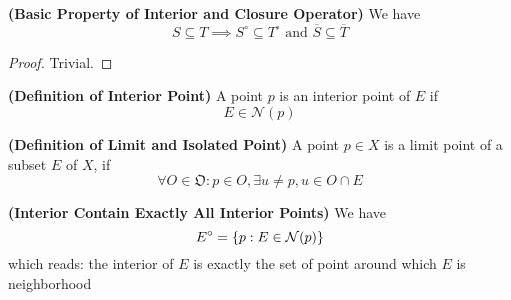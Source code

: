 \documentclass{report}
\begin{document}
\begin{theorem}
\label{2.6.5}
\textbf{(Basic Property of Interior and Closure Operator)} We have
\begin{equation}
S\subseteq T \implies S^\circ \subseteq T^\circ\text{ and }\overline{S}\subseteq \overline{T}
\end{equation}
\end{theorem}
\begin{proof}
Trivial.
\end{proof}
\begin{definition}
\label{2.6.6}
\textbf{(Definition of Interior Point)} A point $p$ is an interior point of $E$ if
\begin{equation}
E\in \mathcal{N}(p)
\end{equation}
\end{definition}
\begin{definition}
\label{2.6.7}
\textbf{(Definition of Limit and Isolated Point)} A point $p \in X$ is a limit point of a subset $E$ of $X$, if 
\begin{equation}
\forall O\in \mathfrak{O}:p \in O, \exists u\neq p, u \in O\cap E
\end{equation}
\end{definition}
\begin{theorem}
\label{2.6.8}
\textbf{(Interior Contain Exactly All Interior Points)} We have
\begin{equation}
E^\circ = \{ p:E\in \mathcal{N}(p) \}
\end{equation}
which reads: the interior of $E$ is exactly the set of point around which $E$ is neighborhood
\end{theorem}
\end{document}
